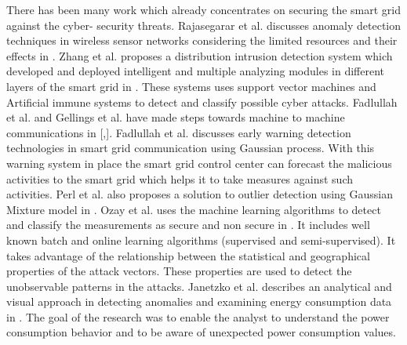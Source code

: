 \frenchspacing There has been many work which already concentrates on securing the smart grid against the cyber- security threats. Rajasegarar et al. discusses anomaly detection techniques in wireless sensor networks considering the limited resources and their effects in \cite{rajasegarar2008anomaly}. Zhang et al. proposes a distribution intrusion detection system which developed and deployed intelligent and multiple analyzing modules in different layers of the smart grid in \cite{zhang2011distributed}. These systems uses support vector machines and Artificial immune systems to detect and classify possible cyber attacks. Fadlullah et al. and Gellings et al. have made steps towards machine to machine communications in [\cite{fadlullah2011early},\cite{gellings2009smart}]. Fadlullah et al. discusses early warning detection technologies in smart grid communication using Gaussian process. With this warning system in place the smart grid control center can forecast the malicious activities to the smart grid which helps it to take measures against such activities. Perl et al. also proposes a solution to outlier detection using Gaussian Mixture model in \cite{perl2009outlier}. Ozay et al. uses the machine learning algorithms to detect and classify the measurements as secure and non secure in \cite{ozay2015machine}. It includes well known batch and online learning algorithms (supervised and semi-supervised). It takes advantage of the relationship between the statistical and geographical properties of the attack vectors. These properties are used to detect the unobservable patterns in the attacks. Janetzko et al. describes an analytical and visual approach in detecting anomalies and examining energy consumption data in \cite{janetzko2014anomaly}. The goal of the research was to enable the analyst to understand the power consumption behavior and to be aware of unexpected power consumption values. 

